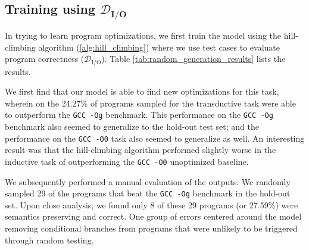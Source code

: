 \documentclass{article}
\def\correctfuncio/{\ensuremath{\mathcal{D}_\textrm{I/O}}}
\def\correctfuncsmt/{\ensuremath{\mathcal{D}_\textrm{verifier}}}
\begin{document}

\subsection{Training using $\bm{\mathcal{D}_\textrm{I/O}}$}
\label{sec:sec:results_training_with_test_cases}



In trying to learn program optimizations, we first train the model using the hill-climbing algorithm (\cref{alg:hill_climbing}) where we use test cases to evaluate program correctness (\correctfuncio/). Table \ref{tab:random_generation_results} lists the results. 

We first find that our model is able to find new optimizations for this task, wherein on the 24.27\% of programs sampled for the transductive task were able to outperform the \texttt{GCC -Og} benchmark. This performance on the \texttt{GCC -Og} benchmark also seemed to generalize to the hold-out test set; and the performance on the \texttt{GCC -O0} task also seemed to generalize as well. An interesting result was that the hill-climbing algorithm performed slightly worse in the inductive task of outperforming the \texttt{GCC -O0} unoptimized baseline. 

We subsequently performed a manual evaluation of the outputs. We randomly sampled 29 of the programs that beat the \texttt{GCC -Og} benchmark in the hold-out set. Upon close analysis, we found only 8 of these 29 programs (or 27.59\%) were semantics preserving and correct. One group of errors centered around the model removing conditional branches from programs that were unlikely to be triggered through random testing. 
%
\end{document}
